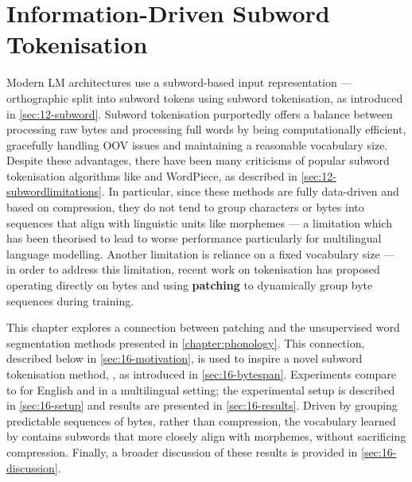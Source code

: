 \chapter{Information-Driven Subword Tokenisation}\label{chapter:infotokenisation}

Modern LM architectures use a subword-based input representation --- orthographic split into subword tokens using subword tokenisation, as introduced in \cref{sec:12-subword}. Subword tokenisation purportedly offers a balance between processing raw bytes and processing full words by being computationally efficient, gracefully handling OOV issues and maintaining a reasonable vocabulary size. Despite these advantages, there have been many criticisms of popular subword tokenisation algorithms like \bpe and WordPiece, as described in \cref{sec:12-subwordlimitations}. In particular, since these methods are fully data-driven and based on compression, they do not tend to group characters or bytes into sequences that align with linguistic units like morphemes --- a limitation which has been theorised to lead to worse performance particularly for multilingual language modelling. Another limitation is reliance on a fixed vocabulary size --- in order to address this limitation, recent work on tokenisation has proposed operating directly on bytes and using \textbf{patching} to dynamically group byte sequences during training.

This chapter explores a connection between patching and the unsupervised word segmentation methods presented in \cref{chapter:phonology}. This connection, described below in \cref{sec:16-motivation}, is used to inspire a novel subword tokenisation method, \bytespan, as introduced in \cref{sec:16-bytespan}.  Experiments compare \bytespan to \bpe for English and in a multilingual setting; the experimental setup is described in \cref{sec:16-setup} and results are presented in \cref{sec:16-results}. Driven by grouping predictable sequences of bytes, rather than compression, the vocabulary learned by \bytespan contains subwords that more closely align with morphemes, without sacrificing compression. Finally, a broader discussion of these results is provided in \cref{sec:16-discussion}.


